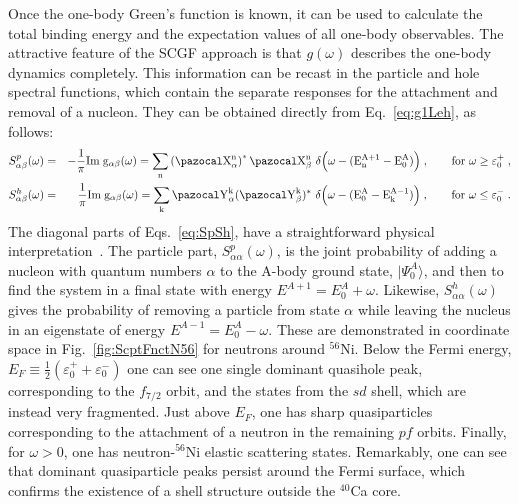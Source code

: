 Once the one-body Green's function is known, it can be used to calculate the total binding energy and the expectation values of all one-body observables.
The attractive feature of the SCGF approach is that $g(\omega)$ describes the one-body dynamics completely.  
This information can be recast in the particle and hole spectral functions, which contain the separate responses for the attachment and removal of a nucleon.
They can be obtained directly from Eq.~\eqref{eq:g1Leh}, as follows:
 \begin{eqnarray}
\nonumber 
S^{p}_{\alpha \beta}(\omega)&=& -\frac 1 \pi \rm{Im} \; g_{\alpha \beta}(\omega) = \sum_{n} \left({\pazocal X}^n_\alpha \right)^*  {\pazocal X}^n_\beta ~ \delta\Big(\omega-(E^{A+1}_n - E^A_0)\Big) \; ,  \qquad \rm{for ~ }\omega \geq \varepsilon^+_0 \; ,
\\
 \label{eq:SpSh}
S^{h}_{\alpha \beta}(\omega)&=& ~~ \frac 1 \pi \rm{Im } \;  g_{\alpha \beta}(\omega) = \sum_{k}  {\pazocal Y}^k_\alpha  ({\pazocal Y}^k_\beta )^* ~\delta\Big(\omega-(E^A_0 - E^{A-1}_k)\Big) \; ,  \qquad \rm{for ~ }\omega \leq \varepsilon^-_0 \;  .
\end{eqnarray} 
The diagonal parts of Eqs.~\eqref{eq:SpSh}, have a straightforward physical interpretation~\cite{ch11_FetterWalecka,ch11_Dickhoff2008}. 
The particle part, $S^p_{\alpha \alpha}(\omega)$, is the joint probability of adding a nucleon with quantum numbers $\alpha$ to the A-body ground state, $|\Psi^A_0\rangle$, and then to find the system in a final state with energy $E^{A+1}=E^A_0 + \omega$. Likewise,  $S^h_{\alpha \alpha}(\omega)$ gives the probability of removing a particle from state $\alpha$ while leaving the nucleus in an eigenstate of energy $E^{A-1}=E^A_0 - \omega$.  These are demonstrated in coordinate space in Fig.~\ref{fig:ScptFnctN56} for neutrons around $^{56}$Ni.  Below the Fermi energy, \hbox{$E_F\equiv \frac 1 2 (\varepsilon^+_0 + \varepsilon^-_0)$} one can see one single dominant quasihole peak, corresponding to the $f_{7/2}$ orbit, and the states from the $sd$ shell, which are instead very fragmented. Just above $E_F$, one has sharp quasiparticles corresponding to the attachment of a neutron in the remaining $pf$ orbits. Finally, for $\omega>0$, one has neutron-$^{56}$Ni elastic scattering states. Remarkably, one can see that dominant quasiparticle peaks persist around the Fermi surface, which  confirms the existence of a shell structure outside the $^{40}$Ca core.



